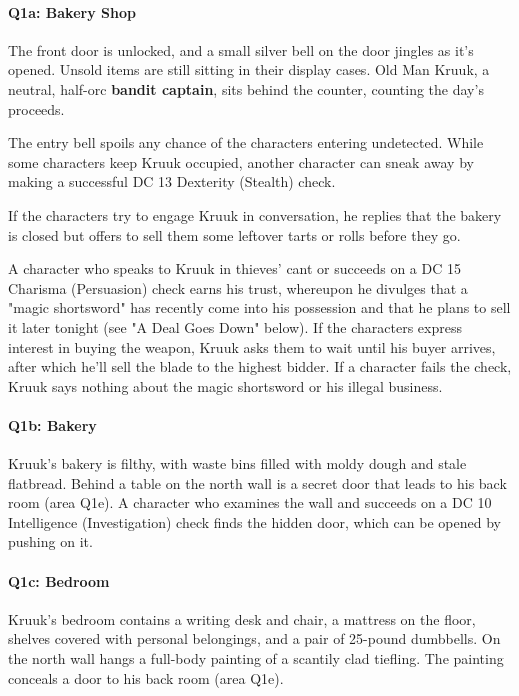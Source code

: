 \documentclass[letterpaper, 11pt, bg=full, twocolumn]{dndbook}
\begin{document}
\paragraph{Q1a: Bakery Shop}

The front door is unlocked, and a small silver bell on the door jingles as it's opened. Unsold items are still sitting in their display cases. Old Man Kruuk, a neutral, half-orc \textbf{bandit captain}, sits behind the counter, counting the day's proceeds.

The entry bell spoils any chance of the characters entering undetected. While some characters keep Kruuk occupied, another character can sneak away by making a successful DC 13 Dexterity (Stealth) check.

If the characters try to engage Kruuk in conversation, he replies that the bakery is closed but offers to sell them some leftover tarts or rolls before they go.

A character who speaks to Kruuk in thieves' cant or succeeds on a DC 15 Charisma (Persuasion) check earns his trust, whereupon he divulges that a "magic shortsword" has recently come into his possession and that he plans to sell it later tonight (see "A Deal Goes Down" below). If the characters express interest in buying the weapon, Kruuk asks them to wait until his buyer arrives, after which he'll sell the blade to the highest bidder. If a character fails the check, Kruuk says nothing about the magic shortsword or his illegal business.

\paragraph{Q1b: Bakery}

Kruuk's bakery is filthy, with waste bins filled with moldy dough and stale flatbread. Behind a table on the north wall is a secret door that leads to his back room (area Q1e). A character who examines the wall and succeeds on a DC 10 Intelligence (Investigation) check finds the hidden door, which can be opened by pushing on it.

\paragraph{Q1c: Bedroom}

Kruuk's bedroom contains a writing desk and chair, a mattress on the floor, shelves covered with personal belongings, and a pair of 25-pound dumbbells. On the north wall hangs a full-body painting of a scantily clad tiefling. The painting conceals a door to his back room (area Q1e).
\end{document}

